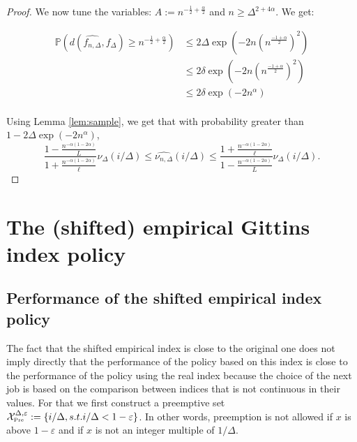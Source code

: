 \documentclass[11pt]{article}
\renewcommand{\epsilon}{\varepsilon}
\renewcommand{\geq}{\geqslant}
\renewcommand{\leq}{\leqslant}
\newcommand{\XP}{\mathcal{X}_{\mbox{\tiny Pre}}}
\begin{document}
\begin{proof}

    We now tune the variables:  $A := n^{-\frac{1}{2} +
    \frac{\alpha}{2}}$ and $n \geq \Delta^{2+4\alpha}$. We get:

    \begin{align*}
        \mathbb{P}(d(\widehat{f_{n, \Delta}},f_\Delta ) \geq n^{-\frac{1}{2} +
        \frac{\alpha}{2}})
        &\leq 2\Delta \exp(-2n(n^{\frac{-1 +
        \alpha}{2}})^2) \\
        &\leq 2 \delta  \exp(-2n(n^{\frac{-1 +
        \alpha}{2}})^2) \\
        &\leq 2 \delta  \exp(-2n^\alpha) \\
    \end{align*}

    Using Lemma \ref{lem:sample}, we get that with probability greater than $1-2\Delta \exp(-2n^\alpha)$,
$$\frac{1 -
    \frac{n^{-\alpha (1-2\alpha)}}{L}}{1+\frac{n^{-\alpha (1-2\alpha)}}{\ell}}
    \nu_\Delta(i/\Delta)
    \leq \widehat{\nu_{n, \Delta}}(i/\Delta) \leq \frac{1 + \frac{n^{-\alpha (1-2\alpha)}}{\ell}}{1 -
    \frac{n^{-\alpha (1-2\alpha)}}{L}} \nu_\Delta(i/\Delta).$$
\end{proof}


\section{The (shifted) empirical Gittins index policy}

\subsection{Performance of the shifted empirical index policy}
\label{ssec:perf}

The fact that the shifted empirical index is close to the original one does not imply directly
that the performance of the policy based on this index is close to the performance of the policy using the real index because the choice of the next job is based on the comparison between indices that is not continuous in their  values.
For that we first construct a preemptive set $\XP^{\Delta,\epsilon} := \{ i/\Delta, s.t. i/\Delta < 1-\epsilon\}$.
In other words, preemption is not allowed if $x$ is above $1-\epsilon$ and if $x$ is not an integer multiple of $1/\Delta$.
\end{document}
